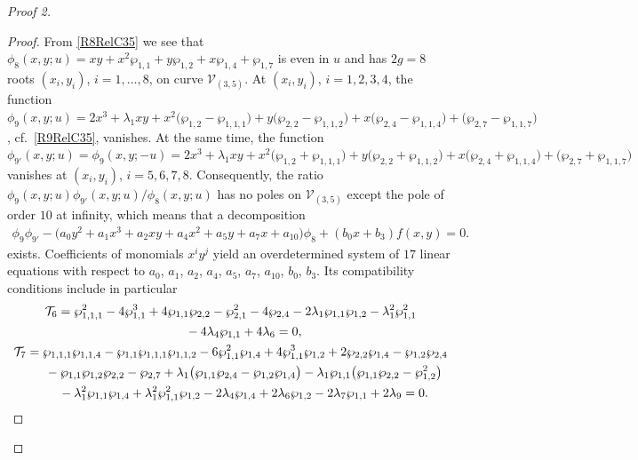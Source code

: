 \documentclass[pdftex]{sigma}
\numberwithin{equation}{section}
\begin{document}
\begin{proof}[Proof 2]
\begin{proof}
From \eqref{R8RelC35} we see that $\phi_{8}(x,y;u) = xy + x^2 \wp_{1,1} + y \wp_{1,2} + x \wp_{1,4} + \wp_{1,7}$ is even in $u$ and has $2g=8$ roots $(x_i,y_i)$, $i=1,\dots,8$, on curve $\mathcal{V}_{(3,5)}$. At $(x_i,y_i)$, $i=1,2,3,4$, the function $\phi_{9}(x,y;u) = 2 x^3 +\lambda_1 xy + x^2 \big(\wp_{1,2} - \wp_{1,1,1}\big) + y\big(\wp_{2,2} - \wp_{1,1,2}\big)+ x\big(\wp_{2,4} - \wp_{1,1,4}\big) + \big(\wp_{2,7} - \wp_{1,1,7}\big)$, cf.~\eqref{R9RelC35}, vanishes. At the same time, the function $\phi_{9'}(x,y;u) = \phi_{9}(x,y;-u) = 2 x^3 +\lambda_1 xy + x^2 \big(\wp_{1,2} + \wp_{1,1,1}\big) + y\big(\wp_{2,2} + \wp_{1,1,2}\big) + x\big(\wp_{2,4} + \wp_{1,1,4}\big) + \big(\wp_{2,7} + \wp_{1,1,7}\big)$ vanishes at $(x_i,y_i)$, $i=5,6,7,8$. Consequently, the ratio $\phi_{9}(x,y;u)\phi_{9'}(x,y;u)/\phi_{8}(x,y;u)$ has no poles on $\mathcal{V}_{(3,5)}$ except the pole of order $10$ at infinity, which means that a decomposition
\begin{gather*}
 \phi_{9}\phi_{9'} - \big(a_0 y^2 + a_1 x^3 + a_2 x y + a_4 x^2 + a_5 y + a_7 x + a_{10}\big)\phi_{8} + (b_0 x+ b_3) f(x,y) = 0.
\end{gather*}
exists.  Coefficients of monomials $x^i y^j$ yield an overdetermined system of $17$ linear equations with respect to $a_0$, $a_1$, $a_2$, $a_4$, $a_5$, $a_7$, $a_{10}$, $b_0$, $b_3$. Its compatibility conditions include in particular
\begin{gather*}
 \mathcal{T}_6 = \wp _{1,1,1}^2 - 4 \wp _{1,1}^3 + 4 \wp _{1,1} \wp _{2,2}
 - \wp _{2,1}^2 - 4 \wp _{2,4} - 2 \lambda_1 \wp _{1,1}\wp _{1,2} - \lambda_1^2 \wp _{1,1}^2\nonumber\\
 \hphantom{\mathcal{T}_6 =}{} - 4\lambda_4 \wp _{1,1} + 4\lambda_6 = 0, \\ %
\mathcal{T}_7 = \wp _{1,1,1}\wp _{1,1,4} - \wp_{1,1}\wp _{1,1,1}\wp _{1,1,2} -6 \wp_{1,1}^2\wp_{1,4} + 4\wp_{1,1}^3 \wp_{1,2} + 2\wp_{2,2}\wp_{1,4}
 -\wp_{1,2} \wp_{2,4} \notag\\
\hphantom{\mathcal{T}_7 =}{} - \wp_{1,1}\wp_{1,2}\wp_{2,2} - \wp_{2,7} + \lambda_1 \big(\wp_{1,1}\wp_{2,4} - \wp_{1,2}\wp_{1,4}\big)
 -\lambda_1 \wp_{1,1} \big(\wp_{1,1}\wp_{2,2} - \wp_{1,2}^2\big)\notag \\
\hphantom{\mathcal{T}_7 =}{} -\lambda_1^2 \wp_{1,1} \wp_{1,4} + \lambda_1^2 \wp_{1,1}^2 \wp_{1,2} -2\lambda_4 \wp_{1,4} +2\lambda_6 \wp_{1,2} -2\lambda_7 \wp_{1,1} + 2\lambda_9 = 0.%
\end{gather*}


\end{proof}
\end{proof}
\end{document}
